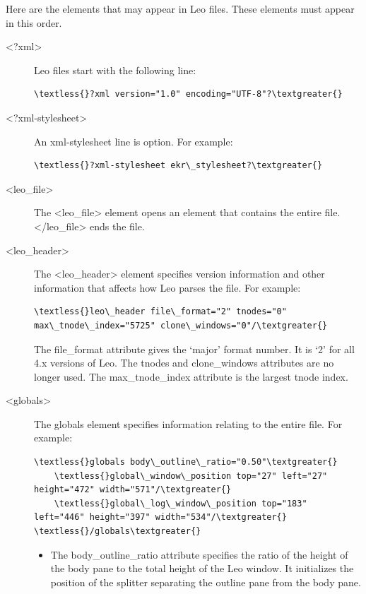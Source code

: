 \documentclass[a4paper,10pt,english]{sphinxmanual}
\begin{document}
Here are the elements that may appear in Leo files.
These elements must appear in this order.
\begin{description}
\item[{\textless{}?xml\textgreater{}}] \leavevmode
Leo files start with the following line:

\begin{Verbatim}[commandchars=\\\{\}]
\textless{}?xml version="1.0" encoding="UTF-8"?\textgreater{}
\end{Verbatim}

\item[{\textless{}?xml-stylesheet\textgreater{}}] \leavevmode
An xml-stylesheet line is option.  For example:

\begin{Verbatim}[commandchars=\\\{\}]
\textless{}?xml-stylesheet ekr\_stylesheet?\textgreater{}
\end{Verbatim}

\item[{\textless{}leo\_file\textgreater{}}] \leavevmode
The \textless{}leo\_file\textgreater{} element opens an element that contains the entire file.
\textless{}/leo\_file\textgreater{} ends the file.

\item[{\textless{}leo\_header\textgreater{}}] \leavevmode
The \textless{}leo\_header\textgreater{} element specifies version information and other information
that affects how Leo parses the file.  For example:

\begin{Verbatim}[commandchars=\\\{\}]
\textless{}leo\_header file\_format="2" tnodes="0" max\_tnode\_index="5725" clone\_windows="0"/\textgreater{}
\end{Verbatim}

The file\_format attribute gives the `major' format number.
It is `2' for all 4.x versions of Leo.
The tnodes and clone\_windows attributes are no longer used.
The max\_tnode\_index attribute is the largest tnode index.

\item[{\textless{}globals\textgreater{}}] \leavevmode
The globals element specifies information relating to the entire file.
For example:

\begin{Verbatim}[commandchars=\\\{\}]
\textless{}globals body\_outline\_ratio="0.50"\textgreater{}
    \textless{}global\_window\_position top="27" left="27" height="472" width="571"/\textgreater{}
    \textless{}global\_log\_window\_position top="183" left="446" height="397" width="534"/\textgreater{}
\textless{}/globals\textgreater{}
\end{Verbatim}
\begin{itemize}
\item {} 
The body\_outline\_ratio attribute specifies the ratio of the height of the body pane to
the total height of the Leo window.
It initializes the position of the splitter separating the outline pane from the body pane.


\end{itemize}
\end{description}
\end{document}
